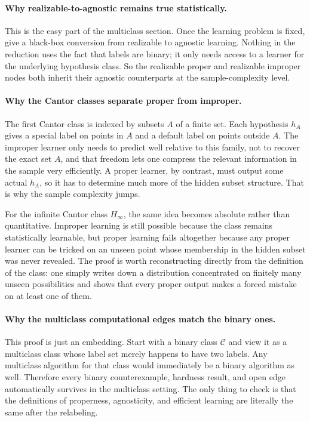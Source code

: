 \paragraph{Why realizable-to-agnostic remains true statistically.}
This is the easy part of the multiclass section. Once the learning problem is fixed, \citet{hopkins2024} give a black-box conversion from realizable to agnostic learning. Nothing in the reduction uses the fact that labels are binary; it only needs access to a learner for the underlying hypothesis class. So the realizable proper and realizable improper nodes both inherit their agnostic counterparts at the sample-complexity level.

\paragraph{Why the Cantor classes separate proper from improper.}
The first Cantor class is indexed by subsets $A$ of a finite set. Each hypothesis $h_A$ gives a special label on points in $A$ and a default label on points outside $A$. The improper learner only needs to predict well relative to this family, not to recover the exact set $A$, and that freedom lets one compress the relevant information in the sample very efficiently. A proper learner, by contrast, must output some actual $h_A$, so it has to determine much more of the hidden subset structure. That is why the sample complexity jumps.

For the infinite Cantor class $H_\infty$, the same idea becomes absolute rather than quantitative. Improper learning is still possible because the class remains statistically learnable, but proper learning fails altogether because any proper learner can be tricked on an unseen point whose membership in the hidden subset was never revealed. The proof is worth reconstructing directly from the definition of the class: one simply writes down a distribution concentrated on finitely many unseen possibilities and shows that every proper output makes a forced mistake on at least one of them.

\paragraph{Why the multiclass computational edges match the binary ones.}
This proof is just an embedding. Start with a binary class $\mathcal{C}$ and view it as a multiclass class whose label set merely happens to have two labels. Any multiclass algorithm for that class would immediately be a binary algorithm as well. Therefore every binary counterexample, hardness result, and open edge automatically survives in the multiclass setting. The only thing to check is that the definitions of properness, agnosticity, and efficient learning are literally the same after the relabeling.

